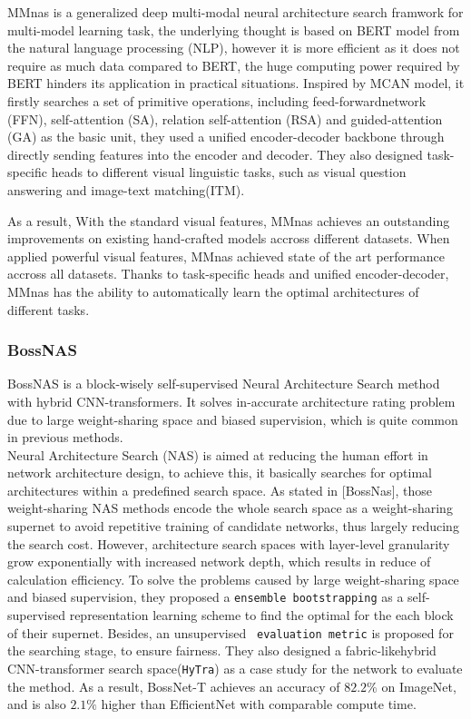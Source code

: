 \documentclass[12pt, a4paper]{article}
\begin{document}
\par\noindent \newline MMnas \cite{DBLP:journals/corr/abs-2004-12070} is a generalized deep multi-modal neural architecture search framwork for multi-model learning task, the underlying thought is based on BERT model from the natural language processing (NLP), however it is more efficient as it does not require as much data compared to BERT, the huge computing power required by BERT hinders its application in practical situations. Inspired by MCAN model, it firstly searches a set of primitive operations, including feed-forwardnetwork (FFN), self-attention (SA), relation self-attention (RSA) and guided-attention (GA) as the basic unit, they used a unified encoder-decoder backbone through directly sending features into the encoder and decoder. They also designed task-specific heads to different visual linguistic tasks, such as visual question answering and image-text matching(ITM).

\par\noindent \newline As a result, With the standard visual features, MMnas \cite{DBLP:journals/corr/abs-2004-12070} achieves an outstanding improvements on existing hand-crafted models accross different datasets. When applied powerful visual features, MMnas achieved state of the art performance accross all datasets. Thanks to task-specific heads and unified encoder-decoder, MMnas \cite{DBLP:journals/corr/abs-2004-12070} has the ability to automatically learn the optimal architectures of different tasks. 

\subsubsection*{BossNAS}
BossNAS is a block-wisely self-supervised Neural Architecture Search method with hybrid CNN-transformers. It solves in-accurate architecture rating problem due to large weight-sharing space and biased supervision, which is quite common in previous methods.\\ Neural Architecture Search (NAS) is aimed at reducing the human effort in network architecture design, to achieve this, it basically searches for optimal architectures within a predefined search space. As stated in [BossNas], those weight-sharing NAS methods encode the whole search space as a weight-sharing supernet to avoid repetitive training of candidate networks, thus largely reducing the search cost. However, architecture search spaces with layer-level granularity grow exponentially with increased network depth, which results in reduce of calculation efficiency. To solve the problems caused by large weight-sharing space and biased supervision, they proposed a \verb|ensemble bootstrapping| as a self-supervised representation learning scheme to find the optimal for the each block of their supernet. Besides, an unsupervised \verb| evaluation metric| is proposed for the searching stage, to ensure fairness. They also designed a fabric-likehybrid CNN-transformer search space(\verb|HyTra|) as a case study for the network to evaluate the method. As a result, BossNet-T achieves an accuracy of $82.2\%$ on ImageNet, and is also $2.1\%$ higher than EfficientNet with comparable compute time.
\end{document}
